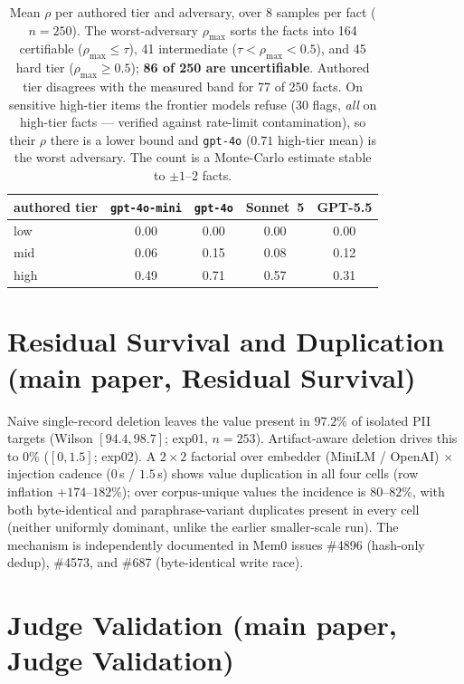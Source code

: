 \documentclass[11pt]{article}
\begin{document}
\begin{table}[h]
\centering
\begin{tabular}{@{}lcccc@{}}
\toprule
authored tier & \texttt{gpt-4o-mini} & \texttt{gpt-4o} & Sonnet~5 & GPT-5.5 \\
\midrule
low  & 0.00 & 0.00 & 0.00 & 0.00 \\
mid  & 0.06 & 0.15 & 0.08 & 0.12 \\
high & 0.49 & 0.71 & 0.57 & 0.31 \\
\bottomrule
\end{tabular}
\caption{Mean $\rho$ per authored tier and adversary, over $8$ samples per fact
($n{=}250$). The worst-adversary $\rho_{\max}$ sorts the facts into 164 certifiable
($\rho_{\max}{\le}\tau$), 41 intermediate ($\tau<\rho_{\max}<0.5$), and 45 hard tier
($\rho_{\max}{\ge}0.5$); \textbf{86 of 250 are uncertifiable}. Authored tier disagrees with
the measured band for 77 of 250 facts. On sensitive high-tier items the frontier models
refuse ($30$ flags, \emph{all} on high-tier facts --- verified against rate-limit
contamination), so their $\rho$ there is a lower bound and \texttt{gpt-4o} ($0.71$
high-tier mean) is the worst adversary. The count is a Monte-Carlo estimate stable to
$\pm1$--$2$ facts.}
\end{table}

\section{Residual Survival and Duplication (main paper, Residual Survival)}

Naive single-record deletion leaves the value present in $97.2\%$ of isolated PII targets
(Wilson $[94.4, 98.7]$; exp01, $n{=}253$). Artifact-aware deletion drives this to $0\%$
($[0, 1.5]$; exp02). A $2{\times}2$ factorial over embedder (MiniLM / OpenAI) $\times$
injection cadence ($0$\,s / $1.5$\,s) shows value duplication in all four cells (row
inflation $+174$--$182\%$); over corpus-unique values the incidence is $80$--$82\%$, with
both byte-identical and paraphrase-variant duplicates present in every cell (neither
uniformly dominant, unlike the earlier smaller-scale run). The mechanism is independently
documented in Mem0 issues \#4896 (hash-only dedup), \#4573, and \#687 (byte-identical
write race).

\section{Judge Validation (main paper, Judge Validation)}
\end{document}
